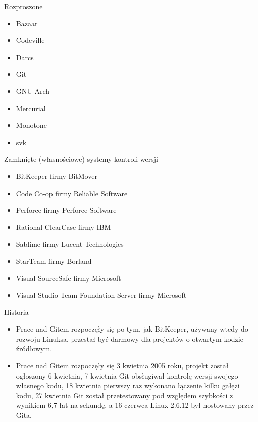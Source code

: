 \documentclass{beamer}
\begin{document}
\begin{frame}{Rozproszone}
\begin{itemize}
  \item Bazaar
  \item Codeville
  \item Darcs
  \item Git
  \item GNU Arch
  \item Mercurial
  \item Monotone
  \item svk
\end{itemize}
\end{frame}

\begin{frame}{Zamknięte (własnościowe) systemy kontroli wersji}
\begin{itemize}
  \item BitKeeper firmy BitMover
  \item Code Co-op firmy Reliable Software
  \item Perforce firmy Perforce Software
  \item Rational ClearCase firmy IBM
  \item Sablime firmy Lucent Technologies
  \item StarTeam firmy Borland
  \item Visual SourceSafe firmy Microsoft
  \item Visual Studio Team Foundation Server firmy Microsoft
\end{itemize}
\end{frame}

\begin{frame}{Historia}
\begin{itemize}
	\item Prace nad Gitem rozpoczęły się po tym, jak BitKeeper, używany wtedy do rozwoju Linuksa, przestał być darmowy dla projektów o otwartym kodzie źródłowym. 
\vskip 1cm
	\item Prace nad Gitem rozpoczęły się 3 kwietnia 2005 roku, projekt został ogłoszony 6 kwietnia, 7 kwietnia Git obsługiwał kontrolę wersji swojego własnego kodu, 18 kwietnia pierwszy raz wykonano łączenie kilku gałęzi kodu, 27 kwietnia Git został przetestowany pod względem szybkości z wynikiem 6,7 łat na sekundę, a 16 czerwca Linux 2.6.12 był hostowany przez Gita.
\end{itemize}
\end{frame}
\end{document}
